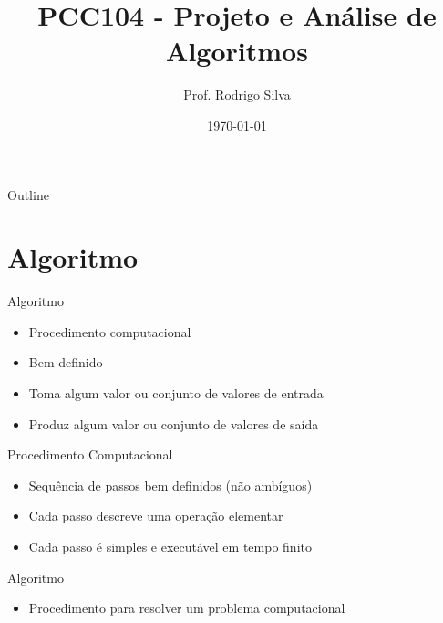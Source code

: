 \documentclass{beamer}
\title{PCC104 - Projeto e Análise de Algoritmos}
\author{Prof. Rodrigo Silva}
\date{\today}
\newcommand{\og}[1]{\textcolor{rsOrange}{#1}}
\begin{document}
\begin{frame}
    \titlepage 
\end{frame}

\logo{}


\begin{frame}{Outline}
    \tableofcontents
\end{frame}


\section{Algoritmo}

\begin{frame}{Algoritmo}
    \begin{block}{}
    \begin{itemize}
        \item Procedimento computacional
        \item Bem definido
        \item Toma algum valor ou conjunto de valores de \og{entrada}
        \item Produz algum valor ou conjunto de valores de \og{saída} 
    \end{itemize}
    \end{block}
\end{frame}
\begin{frame}{Procedimento Computacional}
    \begin{block}{}
    \begin{itemize}
        \item Sequência de passos bem definidos (não ambíguos)
        \item Cada passo descreve uma operação elementar
        \item Cada passo é simples e executável em tempo finito
    \end{itemize}
    \end{block}
\end{frame}
\begin{frame}{Algoritmo}
    \begin{block}{}
    \begin{itemize}
        \item Procedimento para resolver um \og{problema computacional}
    \end{itemize}
    \end{block}
\end{frame}
\end{document}
